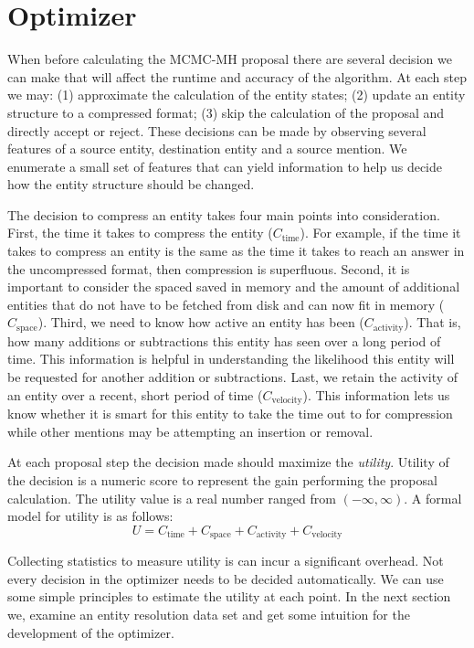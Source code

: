 \section{Optimizer}
\label{sec:optimizer:optimizer}

When before calculating the MCMC-MH proposal there are several decision we can make
that will affect the runtime and accuracy of the algorithm.
At each step we may:
  (1) approximate the calculation of the entity states;
  (2) update an entity structure to a compressed format;
  (3) skip the calculation of the proposal and directly accept or reject.
These decisions can be made by observing several features of a source entity,
destination entity and a source mention.
We enumerate a small set of features that can yield information to
help us decide how the entity structure should be changed.

The decision to compress an entity takes
four main points into consideration. First, the time it takes to compress
the entity ($ C_\text{time}$).
For example, if the time it takes to compress an entity is the same as the time it takes to
reach an answer in the uncompressed format, then compression is superfluous.
Second, it is important to consider the spaced saved in memory and the amount of 
additional entities that do not have to be fetched from disk and can now fit in memory ($C_\text{space}$).
Third, we need to know how active an entity has been ($C_\text{activity}$).
That is, how many additions or subtractions this entity has seen over a long period of time.
This information is helpful in understanding the likelihood this entity will be requested
for another addition or subtractions.
Last, we retain the activity of an entity over a recent, short period of time
($C_\text{velocity}$). This information lets us know whether it is smart for
this entity to take the time out to for compression while other mentions may be
attempting an insertion or removal.

At each proposal step the decision made should maximize the \textit{utility}.
Utility of the decision is a numeric score to represent the gain performing
the proposal calculation. The utility value is a real number ranged from $( -\infty, \infty)$.
A formal model for utility is as follows:
\[
U = C_\text{time} + C_\text{space} + C_\text{activity} + C_\text{velocity}
\]

Collecting statistics to measure utility is can incur a significant overhead.
Not every decision in the optimizer needs to be decided automatically.
We can use some simple principles to estimate the utility at each point.
In the next section we, examine an entity resolution data set and get some
intuition for the development of the optimizer.





